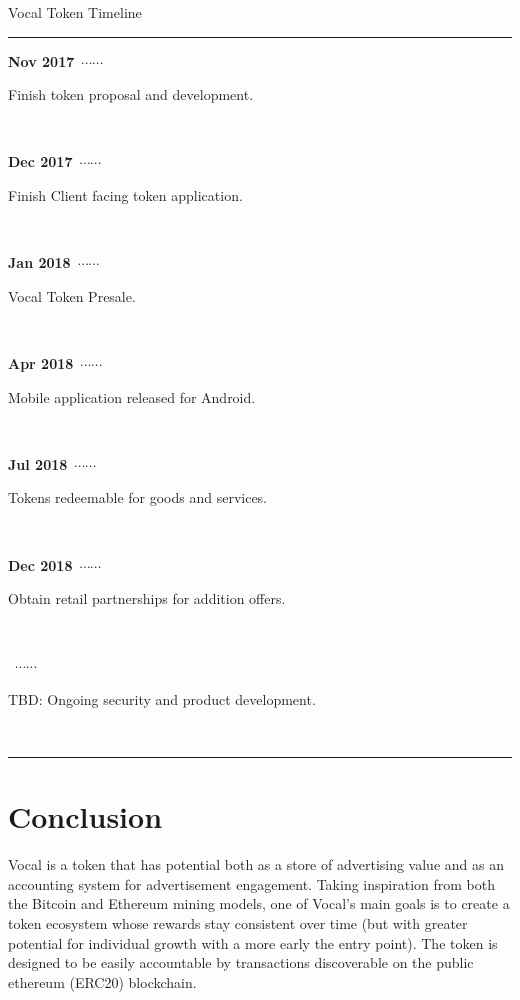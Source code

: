 \documentclass[conference]{IEEEtran}
\begin{document}
    \newcommand\ytl[2]{
    \parbox[b]{8em}{\hfill{\color{cyan}\bfseries\sffamily #1}~$\cdots\cdots$~}\makebox[0pt][c]{$\bullet$}\vrule\quad \parbox[c]{3cm}{\vspace{7pt}\color{red!40!black!80}\raggedright\sffamily #2.\\[7pt]}\\[-3pt]}
    \begin{table}
    \caption{Vocal Token Timeline}
    \centering
    \begin{minipage}[t]{\linewidth}
    \color{gray}
    \rule{\linewidth}{1pt}
    \ytl{Nov 2017}{Finish token proposal and development}
    \ytl{Dec 2017}{Finish Client facing token application}
    \ytl{Jan 2018}{Vocal Token Presale}
    \ytl{Apr 2018}{Mobile application released for Android}
    \ytl{Jul 2018}{Tokens redeemable for goods and services}
    \ytl{Dec 2018}{Obtain retail partnerships for addition offers}
    \ytl{2019}{TBD: Ongoing security and product development}
    \bigskip
    \rule{\linewidth}{1pt}%
    \end{minipage}%
    \end{table}

      
      
    
    \section{Conclusion}
    Vocal is a token that has potential both as a store of advertising value and as an accounting system for advertisement engagement. Taking inspiration from both the Bitcoin and Ethereum mining models, one of Vocal's main goals is to create a token ecosystem whose rewards stay consistent over time (but with greater potential for individual growth with a more early the entry point). The token is designed to be easily accountable by transactions discoverable on the public ethereum (ERC20) blockchain.
\end{document}
